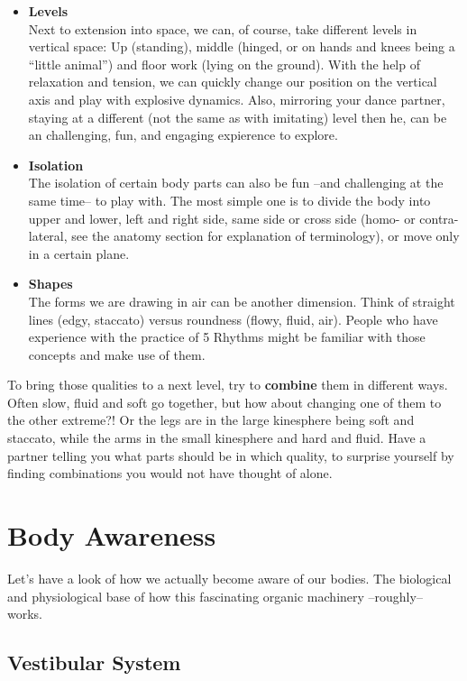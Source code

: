 \begin{itemize}
    \item [] \textbf{Levels} \\
    Next to extension into space, we can, of course, take different levels in vertical space: Up (standing), middle (hinged, or on hands and knees being a ``little animal'') and floor work (lying on the ground).
    With the help of relaxation and tension, we can quickly change our position on the vertical axis and play with explosive dynamics.
    Also, mirroring your dance partner, staying at a different (not the same as with imitating) level then he, can be an challenging, fun, and engaging expierence to explore.

    \item [] \textbf{Isolation} \\
    The isolation of certain body parts can also be fun --and challenging at the same time-- to play with.
    The most simple one is to divide the body into upper and lower, left and right side, same side or cross side (homo- or contra-lateral, see the anatomy section for explanation of terminology), or move only in a certain plane.

    \item [] \textbf{Shapes} \\
    The forms we are drawing in air can be another dimension.
    Think of straight lines (edgy, staccato) versus roundness (flowy, fluid, air).
    People who have experience with the practice of 5 Rhythms might be familiar with those concepts and make use of them.
\end{itemize}

To bring those qualities to a next level, try to \textbf{combine} them in different ways.
Often slow, fluid and soft go together, but how about changing one of them to the other extreme?!
Or the legs are in the large kinesphere being soft and staccato, while the arms in the small kinesphere and hard and fluid.
Have a partner telling you what parts should be in which quality, to surprise yourself by finding combinations you would not have thought of alone.

\section{Body Awareness}\label{sec:body-awareness}

Let's have a look of how we actually become aware of our bodies.
The biological and physiological base of how this fascinating organic machinery --roughly-- works.

\subsection{Vestibular System}\label{subsec:vestibular-system}

